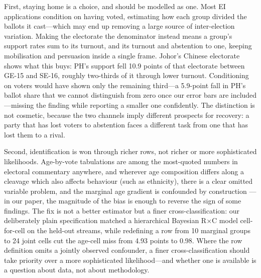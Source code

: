\documentclass[11pt]{article}
\begin{document}
First, staying home is a choice, and should be modelled as one. Most EI applications condition on having voted, estimating how each group divided the ballots it cast---which may end up removing a large source of inter-election variation. Making the electorate the denominator instead means a group's support rates sum to its turnout, and its turnout and abstention to one, keeping mobilisation and persuasion inside a single frame. Johor's Chinese electorate shows what this buys: PH's support fell 10.9 points of that electorate between GE-15 and SE-16, roughly two-thirds of it through lower turnout. Conditioning on voters would have shown only the remaining third---a 5.9-point fall in PH's ballot share that we cannot distinguish from zero once our error bars are included---missing the finding while reporting a smaller one confidently. The distinction is not cosmetic, because the two channels imply different prospects for recovery: a party that has lost voters to abstention faces a different task from one that has lost them to a rival.

Second, identification is won through richer rows, not richer or more sophisticated likelihoods. Age-by-vote tabulations are among the most-quoted numbers in electoral commentary anywhere, and wherever age composition differs along a cleavage which also affects behaviour (such as ethnicity), there is a clear omitted variable problem, and the marginal age gradient is confounded by construction \cite{achenshively1995,chen2026}---in our paper, the magnitude of the bias is enough to reverse the sign of some findings. The fix is not a better estimator but a finer cross-classification: our deliberately plain specification matched a hierarchical Bayesian R$\times$C model cell-for-cell on the held-out streams, while redefining a row from 10 marginal groups to 24 joint cells cut the age-cell miss from 4.93 points to 0.98. Where the row definition omits a jointly observed confounder, a finer cross-classification should take priority over a more sophisticated likelihood---and whether one is available is a question about data, not about methodology.
\end{document}
